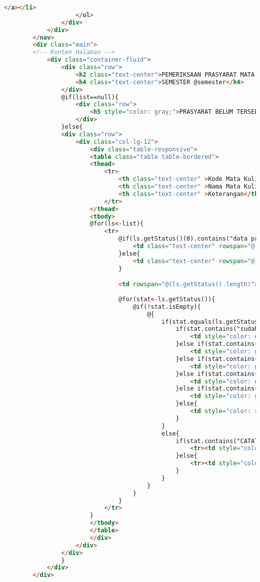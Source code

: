 \begin{lstlisting}[language=html,basicstyle=\tiny,caption=prasyarat.scala.html]
						</a></li>
					</ul>
				</div>
			</div>
		</nav>
		<div class="main">
		<!-- Konten Halaman -->
			<div class="container-fluid">
				<div class="row">
					<h2 class="text-center">PEMERIKSAAN PRASYARAT MATA KULIAH</h2> 
					<h4 class="text-center">SEMESTER @semester</h4> 
				</div>
				@if(list==null){
					<div class="row">
						<h5 style="color: gray;">PRASYARAT BELUM TERSEDIA <span class="glyphicon glyphicon-exclamation-sign"></span></h5>
					</div>	
				}else{
				<div class="row">
                    <div class="col-lg-12">
						<div class="table-responsive">
						<table class="table table-bordered">
						<thead>
							<tr>
								<th class="text-center" >Kode Mata Kuliah</th>
								<th class="text-center" >Nama Mata Kuliah</th>
								<th class="text-center" >Keterangan</th>
							</tr>
						</thead>
						<tbody>
						@for(ls<-list){
							<tr>
								@if(ls.getStatus()(0).contains("data prasyarat tidak tersedia")){
									<td class="text-center" rowspan="@(ls.getStatus().length)">@ls.getMataKuliah().kode()</td>
								}else{
									<td class="text-center" rowspan="@(ls.getStatus().length)"><a target="_blank" href= @{val ref = "https://github.com/herfanheryandi/Skripsi/blob/master/app/StudentPortal/app/models/id/ac/unpar/siamodels/matakuliah/"+ls.getMataKuliah().kode()+".java"; ref}>@ls.getMataKuliah().kode()</a></td>
								}

								<td rowspan="@(ls.getStatus().length)">@ls.getMataKuliah().nama()</td>
								
								@for(stat<-ls.getStatus()){
									@if(!stat.isEmpty){
										@{
											if(stat.equals(ls.getStatus()(0))){
												if(stat.contains("sudah lulus")){
													<td style="color: #0066FF;">{stat} <span class="glyphicon glyphicon-flag"></span></td>
												}else if(stat.contains("memenuhi syarat")){
													<td style="color: green;">{stat} <span class="glyphicon glyphicon-ok"></span></td>
												}else if(stat.contains("tidak memiliki prasyarat")){
													<td style="color: green;">{stat} <span class="glyphicon glyphicon-ok"></span></td>
												}else if(stat.contains("CATATAN:")){
													<td style="color: #FF9900;">{stat} <span class="glyphicon glyphicon-warning-sign"></span></td>
												}else if(stat.contains("data prasyarat tidak tersedia")){
													<td style="color: gray;">{stat} <span class="glyphicon glyphicon-exclamation-sign"></span></td>
												}else{
													<td style="color: red;">{stat} <span class="glyphicon glyphicon-remove"></span></td>
												}	
											}
											else{
												if(stat.contains("CATATAN:")){
													<tr><td style="color: #FF9900;">{stat} <span class="glyphicon glyphicon-warning-sign"></span></td></tr>
												}else{
													<tr><td style="color: red;">{stat} <span class="glyphicon glyphicon-remove"></span></td></tr>
												}
											}
										}
									}
								}
							</tr>
						}
						</tbody>
						</table>
						</div>
					</div>
                </div>
                }
			</div>
		</div>
		

\end{lstlisting}

